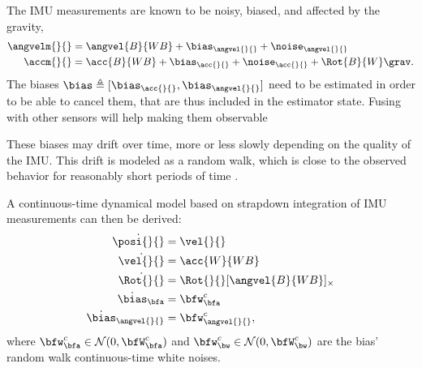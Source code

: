 The IMU measurements are known to be noisy, biased, and affected by the gravity,
%
\begin{equation}
    \begin{split}
    \angvelm{}{} &= \angvel{B}{WB} + \bias_{\angvel{}{}} + \noise_{\angvel{}{}} 
    \\
    \accm{}{}    &= \acc{B}{WB} + \bias_{\acc{}{}} + \noise_{\acc{}{}} + \Rot{B}{W} \grav .
    \end{split}
    \label{eq:imu_meas_model}
\end{equation}
%    
The biases $\bias \triangleq [\bias_{\acc{}{}}, \bias_{\angvel{}{}}]$ need to be estimated in order to be able to cancel them,   that are thus included in the estimator state.
Fusing with other sensors will help making them observable

These biases may drift over time, more or less slowly depending on the quality of the IMU. This drift is modeled 
as a random walk, which is close to the observed behavior for reasonably short periods of time \cite{hussen2015low}.

A continuous-time dynamical model  based on strapdown integration of IMU measurements can then be derived:
%
\begin{align}
\begin{split}
    \dot{\posi{}{}} &= \vel{}{} \\
    \dot{\vel{}{}} &= \acc{W}{WB} \\
    \dot{\Rot{}{}} &= \Rot{}{} [\angvel{B}{WB}]_{\times} \\
    \dot{\bias}_{\bfa} &= \bfw_{\bfa}^c \\
    \dot{\bias}_{\angvel{}{}} &= \bfw_{\angvel{}{}}^c ,
\end{split}
\label{eq:imu_dyn_conti}
\end{align}
%
where $\bfw_{\bfa}^c \in \mathcal{N}(0,\bfW_\bfa^c)$ and $\bfw_{\bw}^c \in \mathcal{N}(0,\bfW_\bw^c)$ are the bias' random walk continuous-time white noises.

